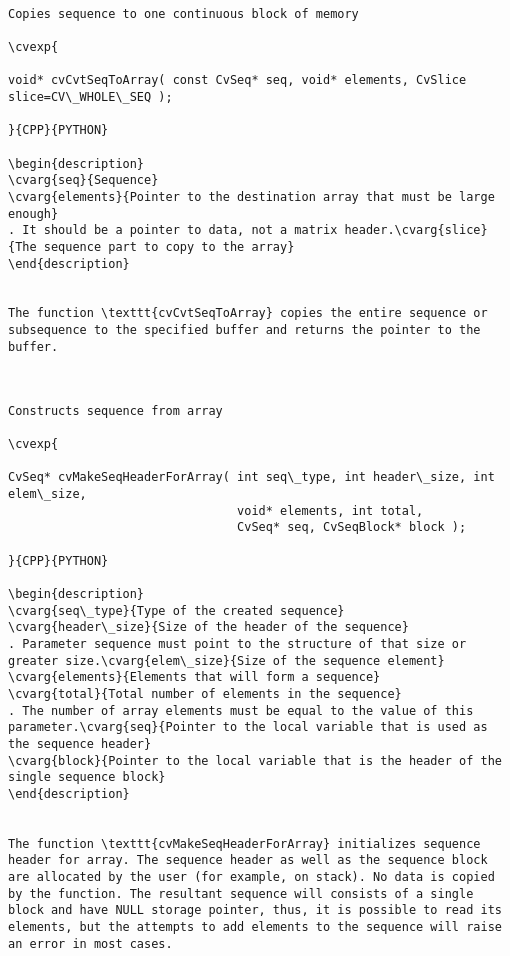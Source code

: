 \begin{verbatim}

Copies sequence to one continuous block of memory

\cvexp{

void* cvCvtSeqToArray( const CvSeq* seq, void* elements, CvSlice slice=CV\_WHOLE\_SEQ );

}{CPP}{PYTHON}

\begin{description}
\cvarg{seq}{Sequence}
\cvarg{elements}{Pointer to the destination array that must be large enough}
. It should be a pointer to data, not a matrix header.\cvarg{slice}{The sequence part to copy to the array}
\end{description}


The function \texttt{cvCvtSeqToArray} copies the entire sequence or subsequence to the specified buffer and returns the pointer to the buffer.


\end{verbatim}
\begin{verbatim}

Constructs sequence from array

\cvexp{

CvSeq* cvMakeSeqHeaderForArray( int seq\_type, int header\_size, int elem\_size,
                                void* elements, int total,
                                CvSeq* seq, CvSeqBlock* block );

}{CPP}{PYTHON}

\begin{description}
\cvarg{seq\_type}{Type of the created sequence}
\cvarg{header\_size}{Size of the header of the sequence}
. Parameter sequence must point to the structure of that size or greater size.\cvarg{elem\_size}{Size of the sequence element}
\cvarg{elements}{Elements that will form a sequence}
\cvarg{total}{Total number of elements in the sequence}
. The number of array elements must be equal to the value of this parameter.\cvarg{seq}{Pointer to the local variable that is used as the sequence header}
\cvarg{block}{Pointer to the local variable that is the header of the single sequence block}
\end{description}


The function \texttt{cvMakeSeqHeaderForArray} initializes sequence header for array. The sequence header as well as the sequence block are allocated by the user (for example, on stack). No data is copied by the function. The resultant sequence will consists of a single block and have NULL storage pointer, thus, it is possible to read its elements, but the attempts to add elements to the sequence will raise an error in most cases.


\end{verbatim}
